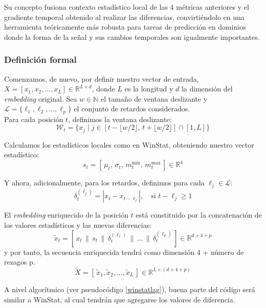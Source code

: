 Su concepto fusiona contexto estadístico local de las 4 métricas anteriores y el gradiente temporal obtenido al realizar las diferencias, convirtiéndolo en una herramienta teóricamente más robusta para tareas de predicción en dominios donde la forma de la señal y sus cambios temporales son igualmente importantes.

\subsubsection{Definición formal}

Comenzamos, de nuevo, por definir nuestro vector de entrada, $X = [x_1, x_2, \dots, x_L] \in \mathbb{R}^{L \times d}$, donde $L$ es la longitud y $d$ la dimensión del \textit{embedding} original. Sea $w \in \mathbb{N}$ el tamaño de ventana deslizante y $\mathcal{L} = \{\ell_1, \ell_2, \dots, \ell_p\}$ el conjunto de retardos considerados.\\

Para cada posición $t$, definimos la ventana deslizante:
\[
\mathcal{W}_t = \{ x_j \mid j \in [t - \lfloor w/2 \rfloor,\, t + \lfloor w/2 \rfloor] \cap [1, L] \}
\]

Calculamos los estadísticos locales como en WinStat, obteniendo nuestro vector estadístico:
\[
s_t = [\,\mu_t,\, \sigma_t,\, m^{\min}_t,\, m^{\max}_t\,] \in \mathbb{R}^4
\]

Y ahora, adicionalmente, para los retardos, definimos para cada $\ell_j \in \mathcal{L}$:
\[
\delta_t^{(\ell_j)} = | x_t - x_{t - \ell_j}|, \quad \text{si } t - \ell_j \geq 1
\]

El \textit{embedding} enriquecido de la posición $t$ está constituido por la concatenación de los valores estadísticos y las nuevas diferencias:
\[
\tilde{x}_t = [\,x_t \,\|\, s_t \,\|\, \delta_t^{(\ell_1)} \,\|\, \dots \,\|\, \delta_t^{(\ell_p)}\,] \in \mathbb{R}^{d + 4 + p}
\]
y por tanto, la secuencia enriquecida tendrá como dimensión 4 + número de rezagos p.
\[
\tilde{X} = [\,\tilde{x}_1, \tilde{x}_2, \dots, \tilde{x}_L\,] \in \mathbb{R}^{L \times (d+4+p )}
\]

A nivel algorítmico (ver pseudocódigo \ref{winstatlag}), buena parte del código será similar a WinStat, al cual tendrán que agregarse los valores de diferencia.

